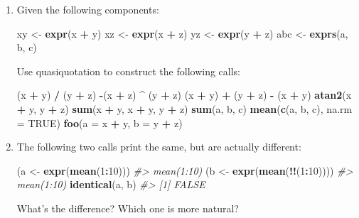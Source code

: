 \documentclass[]{book}
\newenvironment{Shaded}{\begin{snugshade}}{\end{snugshade}}
\newcommand{\CommentTok}[1]{\textcolor[rgb]{0.37,0.37,0.37}{\textit{#1}}}
\newcommand{\DataTypeTok}[1]{\textcolor[rgb]{0.27,0.27,0.27}{#1}}
\newcommand{\DecValTok}[1]{\textcolor[rgb]{0.06,0.06,0.06}{#1}}
\newcommand{\KeywordTok}[1]{\textcolor[rgb]{0.27,0.27,0.27}{\textbf{#1}}}
\newcommand{\NormalTok}[1]{#1}
\newcommand{\OperatorTok}[1]{\textcolor[rgb]{0.43,0.43,0.43}{\textbf{#1}}}
\newcommand{\OtherTok}[1]{\textcolor[rgb]{0.37,0.37,0.37}{#1}}
\newcommand{\StringTok}[1]{\textcolor[rgb]{0.5,0.5,0.5}{#1}}
\begin{document}
\begin{enumerate}
\def\labelenumi{\arabic{enumi}.}
\item
  Given the following components:

\begin{Shaded}
\begin{Highlighting}[]
\NormalTok{xy <-}\StringTok{ }\KeywordTok{expr}\NormalTok{(x }\OperatorTok{+}\StringTok{ }\NormalTok{y)}
\NormalTok{xz <-}\StringTok{ }\KeywordTok{expr}\NormalTok{(x }\OperatorTok{+}\StringTok{ }\NormalTok{z)}
\NormalTok{yz <-}\StringTok{ }\KeywordTok{expr}\NormalTok{(y }\OperatorTok{+}\StringTok{ }\NormalTok{z)}
\NormalTok{abc <-}\StringTok{ }\KeywordTok{exprs}\NormalTok{(a, b, c)}
\end{Highlighting}
\end{Shaded}

  Use quasiquotation to construct the following calls:

\begin{Shaded}
\begin{Highlighting}[]
\NormalTok{(x }\OperatorTok{+}\StringTok{ }\NormalTok{y) }\OperatorTok{/}\StringTok{ }\NormalTok{(y }\OperatorTok{+}\StringTok{ }\NormalTok{z)}
\OperatorTok{-}\NormalTok{(x }\OperatorTok{+}\StringTok{ }\NormalTok{z) }\OperatorTok{^}\StringTok{ }\NormalTok{(y }\OperatorTok{+}\StringTok{ }\NormalTok{z)}
\NormalTok{(x }\OperatorTok{+}\StringTok{ }\NormalTok{y) }\OperatorTok{+}\StringTok{ }\NormalTok{(y }\OperatorTok{+}\StringTok{ }\NormalTok{z) }\OperatorTok{-}\StringTok{ }\NormalTok{(x }\OperatorTok{+}\StringTok{ }\NormalTok{y)}
\KeywordTok{atan2}\NormalTok{(x }\OperatorTok{+}\StringTok{ }\NormalTok{y, y }\OperatorTok{+}\StringTok{ }\NormalTok{z)}
\KeywordTok{sum}\NormalTok{(x }\OperatorTok{+}\StringTok{ }\NormalTok{y, x }\OperatorTok{+}\StringTok{ }\NormalTok{y, y }\OperatorTok{+}\StringTok{ }\NormalTok{z)}
\KeywordTok{sum}\NormalTok{(a, b, c)}
\KeywordTok{mean}\NormalTok{(}\KeywordTok{c}\NormalTok{(a, b, c), }\DataTypeTok{na.rm =} \OtherTok{TRUE}\NormalTok{)}
\KeywordTok{foo}\NormalTok{(}\DataTypeTok{a =}\NormalTok{ x }\OperatorTok{+}\StringTok{ }\NormalTok{y, }\DataTypeTok{b =}\NormalTok{ y }\OperatorTok{+}\StringTok{ }\NormalTok{z)}
\end{Highlighting}
\end{Shaded}
\item
  The following two calls print the same, but are actually different:

\begin{Shaded}
\begin{Highlighting}[]
\NormalTok{(a <-}\StringTok{ }\KeywordTok{expr}\NormalTok{(}\KeywordTok{mean}\NormalTok{(}\DecValTok{1}\OperatorTok{:}\DecValTok{10}\NormalTok{)))}
\CommentTok{#> mean(1:10)}
\NormalTok{(b <-}\StringTok{ }\KeywordTok{expr}\NormalTok{(}\KeywordTok{mean}\NormalTok{(}\OperatorTok{!!}\NormalTok{(}\DecValTok{1}\OperatorTok{:}\DecValTok{10}\NormalTok{))))}
\CommentTok{#> mean(1:10)}
\KeywordTok{identical}\NormalTok{(a, b)}
\CommentTok{#> [1] FALSE}
\end{Highlighting}
\end{Shaded}

  What's the difference? Which one is more natural?
\end{enumerate}
\end{document}
